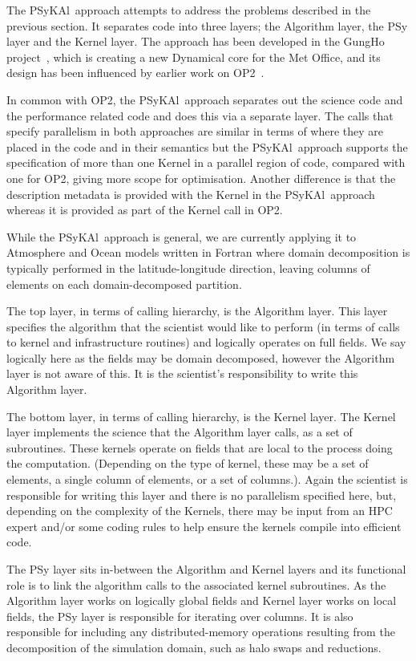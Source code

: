 \documentclass{IOS-Book-Article}
\newcommand{\psykal}{{PS}y{KA}l}
\begin{document}
The \psykal\ approach attempts to address the problems described in the
previous section. It separates code into three layers; the Algorithm
layer, the PSy layer and the Kernel layer. The approach has been
developed in the GungHo project~\cite{GungHo}, which is creating a new
Dynamical core for the Met Office, and its design has been influenced
by earlier work on OP2~\cite{OP2,PYOP2}.

In common with OP2, the \psykal\ approach separates out the science
code and the performance related code and does this via a separate
layer. The calls that specify parallelism in both approaches are
similar in terms of where they are placed in the code and in their
semantics but the \psykal\ approach supports the specification of more
than one Kernel in a parallel region of code, compared with one for
OP2, giving more scope for optimisation. Another difference is that
the description metadata is provided with the Kernel in the \psykal\
approach whereas it is provided as part of the Kernel call in OP2.

While the \psykal\ approach is general, we are currently applying it to
Atmosphere and Ocean models written in Fortran where domain
decomposition is typically performed in the latitude-longitude
direction, leaving columns of elements on each domain-decomposed
partition.

The top layer, in terms of calling hierarchy, is the Algorithm
layer. This layer specifies the algorithm that the scientist would like
to perform (in terms of calls to kernel and infrastructure routines)
and logically operates on full fields. We say logically here as the
fields may be domain decomposed, however the Algorithm layer is not
aware of this. It is the scientist's responsibility to write this
Algorithm layer.

The bottom layer, in terms of calling hierarchy, is the Kernel
layer. The Kernel layer implements the science that the Algorithm
layer calls, as a set of subroutines. These kernels operate on fields
that are local to the process doing the computation. (Depending on the
type of kernel, these may be a set of elements, a single column of
elements, or a set of columns.). Again the scientist is responsible
for writing this layer and there is no parallelism specified here,
but, depending on the complexity of the Kernels, there may be input
from an HPC expert and/or some coding rules to help ensure the kernels
compile into efficient code.

The PSy layer sits in-between the Algorithm and Kernel layers and its
functional role is to link the algorithm calls to the associated
kernel subroutines. As the Algorithm layer works on logically global
fields and Kernel layer works on local fields, the PSy layer is
responsible for iterating over columns. It is also responsible for
including any distributed-memory operations resulting from the
decomposition of the simulation domain, such as halo swaps and
reductions.
\end{document}
